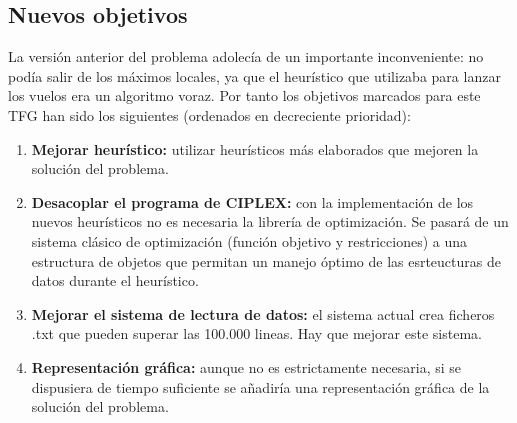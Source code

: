 \subsection{Nuevos objetivos}
La versión anterior del problema adolecía de un importante inconveniente: no podía salir de los máximos locales, ya que el heurístico que utilizaba para lanzar los vuelos era un algoritmo voraz. Por tanto los objetivos marcados para este TFG han sido los siguientes (ordenados en decreciente prioridad):
\begin{enumerate}
	\item \textbf{Mejorar heurístico: }utilizar heurísticos más elaborados que mejoren la solución del problema.
	\item \textbf{Desacoplar el programa de CIPLEX: }con la implementación de los nuevos heurísticos no es necesaria la librería de optimización. Se pasará de un sistema clásico de optimización (función objetivo y restricciones) a una estructura de objetos que permitan un manejo óptimo de las esrteucturas de datos durante el heurístico.
	\item \textbf{Mejorar el sistema de lectura de datos: }el sistema actual crea ficheros .txt que pueden superar las 100.000 lineas. Hay que mejorar este sistema.
	\item \textbf{Representación gráfica: }aunque no es estrictamente necesaria, si se dispusiera de tiempo suficiente se añadiría una representación gráfica de la solución del problema.
\end{enumerate}